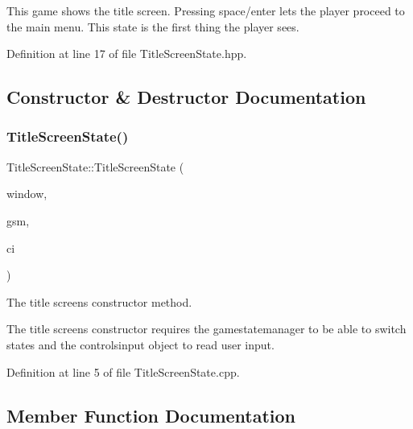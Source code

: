 This game shows the title screen. Pressing space/enter lets the player proceed to the main menu. This state is the first thing the player sees. 

Definition at line 17 of file Title\+Screen\+State.\+hpp.



\subsection{Constructor \& Destructor Documentation}
\mbox{\label{class_title_screen_state_ae0ab0c01ac47f036618a9d328d547ccd}} 
\subsubsection{\texorpdfstring{Title\+Screen\+State()}{TitleScreenState()}}
{\footnotesize\ttfamily Title\+Screen\+State\+::\+Title\+Screen\+State (\begin{DoxyParamCaption}\item[{sf\+::\+Render\+Window \&}]{window,  }\item[{\hyperlink{class_game_state_manager}{Game\+State\+Manager} \&}]{gsm,  }\item[{\hyperlink{struct_controls_input}{Controls\+Input} \&}]{ci }\end{DoxyParamCaption})}



The title screen\textquotesingle{}s constructor method. 

The title screen\textquotesingle{}s constructor requires the gamestatemanager to be able to switch states and the controlsinput object to read user input. 

Definition at line 5 of file Title\+Screen\+State.\+cpp.



\subsection{Member Function Documentation}
\mbox{\label{class_title_screen_state_a1e1022947dac4a9b69c6bde57fe52217}} 
